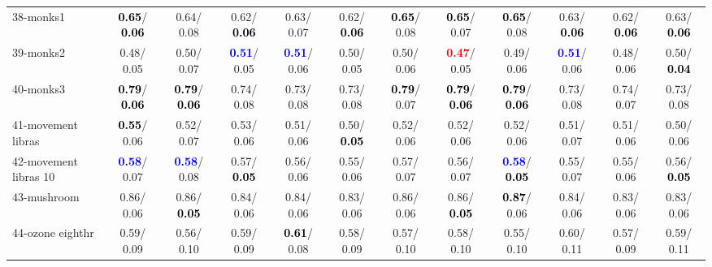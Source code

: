 \begin{table}[h]
\begin{center}
{\begin{tabular}{lc|c|c|c|c|c|c|c|c|c|c}
38-monks1 & \textcolor{black}{\textbf{  0.65}}/\textcolor{black}{\textbf{  0.06}} &   0.64/  0.08 &   0.62/\textcolor{black}{\textbf{  0.06}} &   0.63/  0.07 &   0.62/\textcolor{black}{\textbf{  0.06}} & \textcolor{black}{\textbf{  0.65}}/  0.08 & \textcolor{black}{\textbf{  0.65}}/  0.07 & \textcolor{black}{\textbf{  0.65}}/  0.08 &   0.63/\textcolor{black}{\textbf{  0.06}} &   0.62/\textcolor{black}{\textbf{  0.06}} &   0.63/\textcolor{black}{\textbf{  0.06}} \\
39-monks2 &   0.48/  0.05 &   0.50/  0.07 & \textcolor{blue}{\textbf{  0.51}}/  0.05 & \textcolor{blue}{\textbf{  0.51}}/  0.06 &   0.50/  0.05 &   0.50/  0.06 & \textcolor{red}{\textbf{  0.47}}/  0.05 &   0.49/  0.06 & \textcolor{blue}{\textbf{  0.51}}/  0.06 &   0.48/  0.06 &   0.50/\textcolor{black}{\textbf{  0.04}} \\ \hline
40-monks3 & \textcolor{black}{\textbf{  0.79}}/\textcolor{black}{\textbf{  0.06}} & \textcolor{black}{\textbf{  0.79}}/\textcolor{black}{\textbf{  0.06}} &   0.74/  0.08 &   0.73/  0.08 &   0.73/  0.08 & \textcolor{black}{\textbf{  0.79}}/  0.07 & \textcolor{black}{\textbf{  0.79}}/\textcolor{black}{\textbf{  0.06}} & \textcolor{black}{\textbf{  0.79}}/\textcolor{black}{\textbf{  0.06}} &   0.73/  0.08 &   0.74/  0.07 &   0.73/  0.08 \\
41-movement libras & \textcolor{black}{\textbf{  0.55}}/  0.06 &   0.52/  0.07 &   0.53/  0.06 &   0.51/  0.06 &   0.50/\textcolor{black}{\textbf{  0.05}} &   0.52/  0.06 &   0.52/  0.06 &   0.52/  0.06 &   0.51/  0.07 &   0.51/  0.06 &   0.50/  0.06 \\
42-movement libras 10 & \textcolor{blue}{\textbf{  0.58}}/  0.07 & \textcolor{blue}{\textbf{  0.58}}/  0.08 &   0.57/\textcolor{black}{\textbf{  0.05}} &   0.56/  0.06 &   0.55/  0.06 &   0.57/  0.07 &   0.56/  0.07 & \textcolor{blue}{\textbf{  0.58}}/\textcolor{black}{\textbf{  0.05}} &   0.55/  0.07 &   0.55/  0.06 &   0.56/\textcolor{black}{\textbf{  0.05}} \\
43-mushroom &   0.86/  0.06 &   0.86/\textcolor{black}{\textbf{  0.05}} &   0.84/  0.06 &   0.84/  0.06 &   0.83/  0.06 &   0.86/  0.06 &   0.86/\textcolor{black}{\textbf{  0.05}} & \textcolor{black}{\textbf{  0.87}}/  0.06 &   0.84/  0.06 &   0.83/  0.06 &   0.83/  0.06 \\
44-ozone eighthr &   0.59/  0.09 &   0.56/  0.10 &   0.59/  0.09 & \textcolor{black}{\textbf{  0.61}}/  0.08 &   0.58/  0.09 &   0.57/  0.10 &   0.58/  0.10 &   0.55/  0.10 &   0.60/  0.11 &   0.57/  0.09 &   0.59/  0.11 \\

\end{tabular}}
\end{center}
\end{table}
